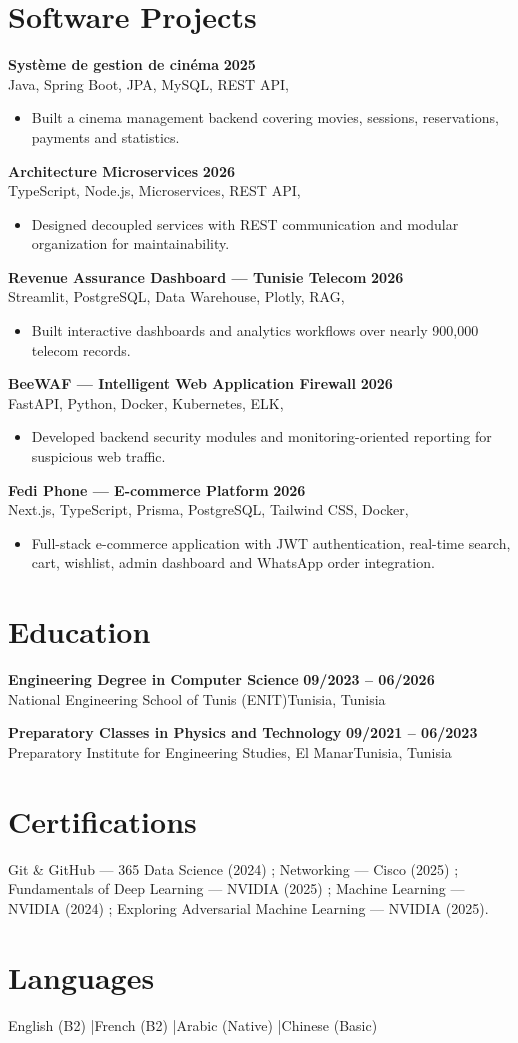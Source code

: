 \documentclass[a4paper,10pt]{article}
\newcommand{\cventry}[4]{\textbf{#1} \hfill \textbf{#4}\\[1pt]#2{\ifx\relax#3\relax\else, #3\fi}\par\vspace{2pt}}
\begin{document}
\section{Software Projects}
\cventry{Système de gestion de cinéma}{Java, Spring Boot, JPA, MySQL, REST API}{}{2025}
\begin{itemize}
  \item Built a cinema management backend covering movies, sessions, reservations, payments and statistics.
\end{itemize}
\cventry{Architecture Microservices}{TypeScript, Node.js, Microservices, REST API}{}{2026}
\begin{itemize}
  \item Designed decoupled services with REST communication and modular organization for maintainability.
\end{itemize}
\cventry{Revenue Assurance Dashboard — Tunisie Telecom}{Streamlit, PostgreSQL, Data Warehouse, Plotly, RAG}{}{2026}
\begin{itemize}
  \item Built interactive dashboards and analytics workflows over nearly 900,000 telecom records.
\end{itemize}
\cventry{BeeWAF — Intelligent Web Application Firewall}{FastAPI, Python, Docker, Kubernetes, ELK}{}{2026}
\begin{itemize}
  \item Developed backend security modules and monitoring-oriented reporting for suspicious web traffic.
\end{itemize}
\cventry{Fedi Phone — E-commerce Platform}{Next.js, TypeScript, Prisma, PostgreSQL, Tailwind CSS, Docker}{}{2026}
\begin{itemize}
  \item Full-stack e-commerce application with JWT authentication, real-time search, cart, wishlist, admin dashboard and WhatsApp order integration.
\end{itemize}
\section{Education}
\cventry{Engineering Degree in Computer Science}{National Engineering School of Tunis (ENIT)}{Tunisia}{09/2023 -- 06/2026}
\cventry{Preparatory Classes in Physics and Technology}{Preparatory Institute for Engineering Studies, El Manar}{Tunisia}{09/2021 -- 06/2023}
\section{Certifications}
Git \& GitHub — 365 Data Science (2024) ; Networking — Cisco (2025) ; Fundamentals of Deep Learning — NVIDIA (2025) ; Machine Learning — NVIDIA (2024) ; Exploring Adversarial Machine Learning — NVIDIA (2025).
\section{Languages}
English (B2) \quad|\quad French (B2) \quad|\quad Arabic (Native) \quad|\quad Chinese (Basic)
\end{document}
